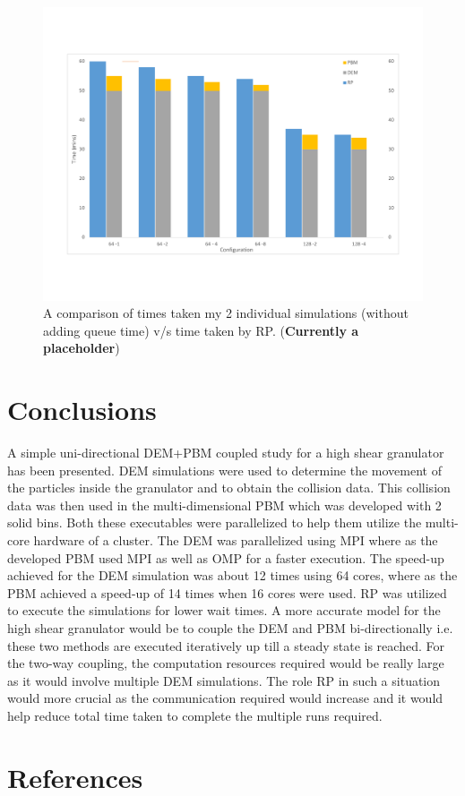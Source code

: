 \documentclass[preprint,11pt,authoryear]{elsarticle}
\begin{document}
\begin{figure}[H]
\centering
\includegraphics[scale=0.5]{rslts_RP_fake_plot.pdf}
\caption{A comparison of times taken my 2 individual simulations (without adding queue time) v/s time taken by RP. 
(\textbf{Currently a placeholder})}
\label{fig:rslts_RP_time_plot}
\end{figure}
	    
\section{Conclusions}
 A simple uni-directional DEM+PBM coupled study for a high shear granulator has been presented. DEM simulations were 
used to determine the movement of the particles inside the granulator and to obtain the collision data. This collision data 
was then used in the multi-dimensional PBM which was developed with 2 solid bins. Both these executables were parallelized 
to help them utilize the multi-core hardware of a cluster. The DEM was parallelized using MPI where as the developed PBM used 
MPI as well as OMP for a faster execution. The speed-up achieved for the DEM simulation was about 12 times using 64 cores, 
where as the PBM achieved a speed-up of 14 times when 16 cores were used. RP was utilized to execute the simulations for lower 
wait times.
 A more accurate model for the high shear granulator would be to couple the DEM and PBM bi-directionally i.e. these 
two methods are executed iteratively up till a steady state is reached. For the two-way coupling, the computation resources 
required would be really large as it would involve multiple DEM simulations. The role RP in such a situation would more crucial 
as the communication required would increase and it would help reduce total time taken to complete the multiple runs required. 

\section*{References} 


\end{document}
